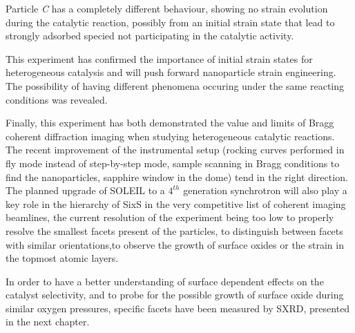 Particle \textit{C} has a completely different behaviour, showing no strain evolution during the catalytic reaction, possibly from an initial strain state that lead to strongly adsorbed specied not participating in the catalytic activity.

This experiment has confirmed the importance of initial strain states for heterogeneous catalysis and will push forward nanoparticle strain engineering.
The possibility of having different phenomena occuring under the same reacting conditions was revealed.

Finally, this experiment has both demonstrated the value and limits of Bragg coherent diffraction imaging when studying heterogeneous catalytic reactions.
The recent improvement of the instrumental setup (rocking curves performed in fly mode instead of step-by-step mode, sample scanning in Bragg conditions to find the nanoparticles, sapphire window in the dome) tend in the right direction.
The planned upgrade of SOLEIL to a $4^{th}$ generation synchrotron will also play a key role in the hierarchy of SixS in the very competitive list of coherent imaging beamlines, the current resolution of the experiment being too low to properly resolve the smallest facets present of the particles, to distinguish between facets with similar orientations,to observe the growth of surface oxides or the strain in the topmost atomic layers.

In order to have a better understanding of surface dependent effects on the catalyst selectivity, and to probe for the possible growth of surface oxide during similar oxygen pressures, specific facets have been measured by SXRD, presented in the next chapter.
